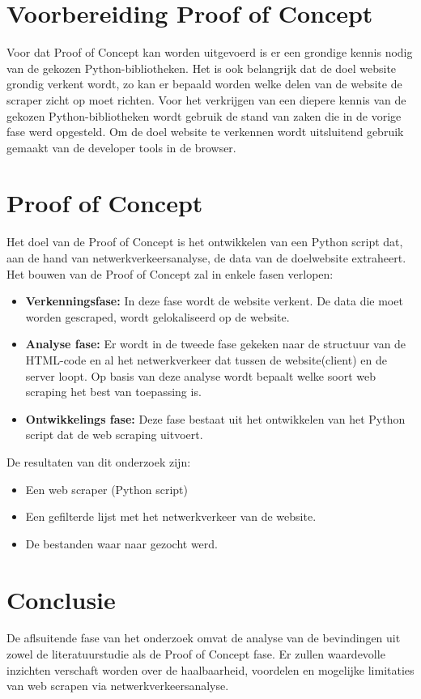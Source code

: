 \section{Voorbereiding Proof of Concept}
Voor dat Proof of Concept kan worden uitgevoerd is er een grondige kennis nodig van de gekozen Python-bibliotheken. Het is ook belangrijk dat de doel website grondig verkent wordt, zo kan er bepaald worden welke delen van de website de scraper zicht op moet richten. Voor het verkrijgen van een diepere kennis van de gekozen Python-bibliotheken wordt gebruik de stand van zaken die in de vorige fase werd opgesteld. Om de doel website te verkennen wordt uitsluitend gebruik gemaakt van de developer tools in de browser.

\section{Proof of Concept}
Het doel van de Proof of Concept is het ontwikkelen van een Python script dat, aan de hand van netwerkverkeersanalyse, de data van de doelwebsite extraheert.
Het bouwen van de Proof of Concept zal in enkele fasen verlopen:
\begin{itemize}
    \item \textbf{Verkenningsfase:} In deze fase wordt de website verkent. De data die moet worden gescraped, wordt gelokaliseerd op de website. 
    
    \item \textbf{Analyse fase:} Er wordt in de tweede fase gekeken naar de structuur van de HTML-code en al het netwerkverkeer dat tussen de website(client) en de server loopt. Op basis van deze analyse wordt bepaalt welke soort web scraping het best van toepassing is.
    
    \item \textbf{Ontwikkelings fase:} Deze fase bestaat uit het ontwikkelen van het Python script dat de web scraping uitvoert.
\end{itemize}
 De resultaten van dit onderzoek zijn: 
\begin{itemize}
    \item Een web scraper (Python script)
    \item Een gefilterde lijst met het netwerkverkeer van de website.
    \item De bestanden waar naar gezocht werd.
\end{itemize}

\section{Conclusie}
De aflsuitende fase van het onderzoek omvat de analyse van de bevindingen uit zowel de literatuurstudie als de Proof of Concept fase. Er zullen waardevolle inzichten verschaft worden over de haalbaarheid, voordelen en mogelijke limitaties van web scrapen via netwerkverkeersanalyse. 
